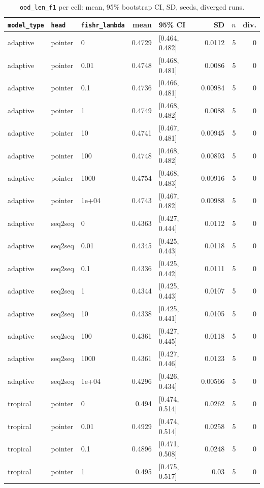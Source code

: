 \documentclass[10pt]{article}
\begin{document}
{\small
\begin{longtable}{lllrlrrr}
\caption{\texttt{ood\_len\_f1} per cell: mean, 95\% bootstrap CI, SD, seeds, diverged runs.}\label{tab:summary-ood_len_f1}\\
\toprule
\texttt{model\_type} & \texttt{head} & \texttt{fishr\_lambda} & mean & 95\% CI & SD & $n$ & div.\\
\midrule
\endhead
adaptive & pointer & 0 & 0.4729 & [0.464, 0.482] & 0.0112 & 5 & 0\\
adaptive & pointer & 0.01 & 0.4748 & [0.468, 0.481] & 0.0086 & 5 & 0\\
adaptive & pointer & 0.1 & 0.4736 & [0.466, 0.481] & 0.00984 & 5 & 0\\
adaptive & pointer & 1 & 0.4749 & [0.468, 0.482] & 0.0088 & 5 & 0\\
adaptive & pointer & 10 & 0.4741 & [0.467, 0.481] & 0.00945 & 5 & 0\\
adaptive & pointer & 100 & 0.4748 & [0.468, 0.482] & 0.00893 & 5 & 0\\
adaptive & pointer & 1000 & 0.4754 & [0.468, 0.483] & 0.00916 & 5 & 0\\
adaptive & pointer & 1e+04 & 0.4743 & [0.467, 0.482] & 0.00988 & 5 & 0\\
adaptive & seq2seq & 0 & 0.4363 & [0.427, 0.444] & 0.0112 & 5 & 0\\
adaptive & seq2seq & 0.01 & 0.4345 & [0.425, 0.443] & 0.0118 & 5 & 0\\
adaptive & seq2seq & 0.1 & 0.4336 & [0.425, 0.442] & 0.0111 & 5 & 0\\
adaptive & seq2seq & 1 & 0.4344 & [0.425, 0.443] & 0.0107 & 5 & 0\\
adaptive & seq2seq & 10 & 0.4338 & [0.425, 0.441] & 0.0105 & 5 & 0\\
adaptive & seq2seq & 100 & 0.4361 & [0.427, 0.445] & 0.0118 & 5 & 0\\
adaptive & seq2seq & 1000 & 0.4361 & [0.427, 0.446] & 0.0123 & 5 & 0\\
adaptive & seq2seq & 1e+04 & 0.4296 & [0.426, 0.434] & 0.00566 & 5 & 0\\
tropical & pointer & 0 & 0.494 & [0.474, 0.514] & 0.0262 & 5 & 0\\
tropical & pointer & 0.01 & 0.4929 & [0.474, 0.514] & 0.0258 & 5 & 0\\
tropical & pointer & 0.1 & 0.4896 & [0.471, 0.508] & 0.0248 & 5 & 0\\
tropical & pointer & 1 & 0.495 & [0.475, 0.517] & 0.03 & 5 & 0\\

\end{longtable}}
\end{document}
